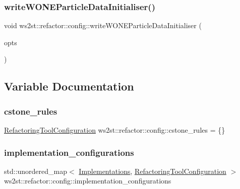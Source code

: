 \subsubsection{\texorpdfstring{write\+W\+O\+N\+E\+Particle\+Data\+Initialiser()}{writeWONEParticleDataInitialiser()}}
{\footnotesize\ttfamily void ws2st\+::refactor\+::config\+::write\+W\+O\+N\+E\+Particle\+Data\+Initialiser (\begin{DoxyParamCaption}\item[{const \mbox{\hyperlink{structWashOptions}{Wash\+Options}} \&}]{opts }\end{DoxyParamCaption})}



\subsection{Variable Documentation}
\mbox{\label{namespacews2st_1_1refactor_1_1config_acb4294be20659997c85738666c145e94}} 
\subsubsection{\texorpdfstring{cstone\+\_\+rules}{cstone\_rules}}
{\footnotesize\ttfamily \mbox{\hyperlink{classws2st_1_1refactor_1_1RefactoringToolConfiguration}{Refactoring\+Tool\+Configuration}} ws2st\+::refactor\+::config\+::cstone\+\_\+rules = \{\}}

\mbox{\label{namespacews2st_1_1refactor_1_1config_aec45ab9284bf3a1ad930abb0fa522c25}} 
\subsubsection{\texorpdfstring{implementation\+\_\+configurations}{implementation\_configurations}}
{\footnotesize\ttfamily std\+::unordered\+\_\+map$<$ \mbox{\hyperlink{common_8hpp_aad9d1428f17c06ff77ef15dea22624dc}{Implementations}}, \mbox{\hyperlink{classws2st_1_1refactor_1_1RefactoringToolConfiguration}{Refactoring\+Tool\+Configuration}} $>$ ws2st\+::refactor\+::config\+::implementation\+\_\+configurations}


